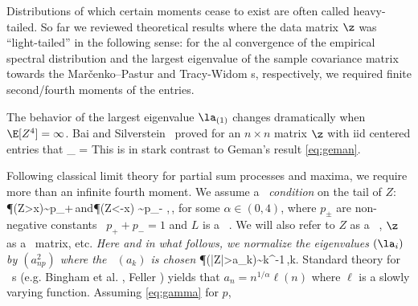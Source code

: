 Distributions of which certain moments cease to exist are often called heavy-tailed. 
So far we reviewed theoretical results where the data matrix $\z$ was ``light-tailed'' in the following sense:
for the \ds al convergence of the empirical 
spectral distribution  and the largest eigenvalue of the sample covariance matrix  towards the 
Mar\v cenko--Pastur 
and Tracy-Widom \ds s, respectively, we  
required finite second/fourth moments of the entries.
\par
The behavior of the largest eigenvalue $\la_{(1)}$ 
changes dramatically when $\E[Z^4]=\infty$.
Bai and Silverstein~\cite{baisilv} proved for an $n\times n$ matrix $\z$ with iid centered entries 
that
\beam\label{eq:wdfr}
\limsup_{\nto} =\infty {}
\eeam
This is in stark contrast to Geman's result \eqref{eq:geman}. 
\par
Following classical limit theory for partial sum processes and maxima, we require more than an infinite fourth moment.
We assume a {\em \regvar\ condition} on the tail of $Z$:
\beam\label{eq:regvar}
\P(Z>x)\sim p_+\,\qquad\mbox{and}\qquad \P(Z<-x) \sim p_-\,\,,\qquad \xto\,,
\eeam
for some $\alpha\in (0,4)$, where $ p_\pm$ are non-negative constants \sth\ $p_++p_-=1$ and $L$ is a \slvary\ \fct .  
We will also refer to $Z$ as a \regvary\ \rv , $\z$ as a \regvary\ matrix, etc.
{\em Here and in what follows, we normalize the eigenvalues $(\la_i)$ by $(a_{np}^2)$ where the \seq\
$(a_k)$ is chosen \sth } 
\beao
\P(|Z|>a_k)\sim k^{-1}\,,\quad k\to\infty.
\eeao
Standard theory for \regvary\ \fct s (e.g. Bingham et al. \cite{bingham:goldie:teugels:1987}, Feller \cite{feller})
yields that $a_n=n^{1/\alpha} \ell(n)$ where $\ell$ is a slowly varying function. Assuming \eqref{eq:gamma} for $p$,

